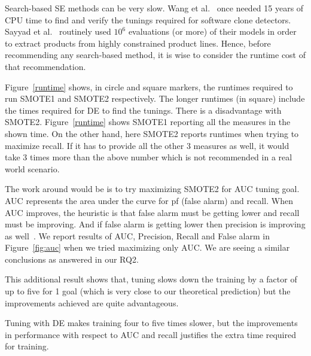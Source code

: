 Search-based SE methods can be very slow. Wang et al.~\cite{wang2013searching} once needed 15
years of CPU time to find and verify the tunings required for software
clone detectors. Sayyad et al.~\cite{sayyad2013scalable} routinely used
$10^6$ evaluations (or more) of their models in order to extract
products from highly constrained product
lines. Hence, before recommending any
search-based method, it is wise to consider the runtime cost of that
recommendation.

 Figure~\ref{runtime} shows,  in circle and square markers, the
  runtimes required to run SMOTE1 and SMOTE2 respectively.  The
  longer runtimes (in square) include the times required for DE to find
  the tunings. There is a disadvantage with SMOTE2. Figure~\ref{runtime} shows SMOTE1 reporting all the measures in the shown time. On the other hand, here SMOTE2 reports runtimes when trying to maximize recall. If it has to provide all the other 3 measures as well, it would take 3 times more than the above number which is not recommended in a real world scenario. 
  
  The work around would be is to try maximizing SMOTE2 for AUC tuning goal. AUC represents the area under the curve for pf (false alarm) and recall. When AUC improves, the heuristic is that false alarm must be getting lower and recall must be improving. And if false alarm is getting lower then precision is improving as well~\cite{menzies2007data}. We report results of AUC, Precision, Recall and False alarm in Figure~\ref{fig:auc} when we tried maximizing only AUC. We are seeing a similar conclusions as answered in our RQ2. 
  
  This additional result shows that, tuning slows down the training by a factor of up to
  five for 1 goal (which is very close to our theoretical prediction) but the improvements achieved are quite advantageous.

\begin{lesson1}
    Tuning with DE makes training four to five times slower, but the improvements in performance with respect to AUC and recall justifies the extra time required for training.
\end{lesson1}
